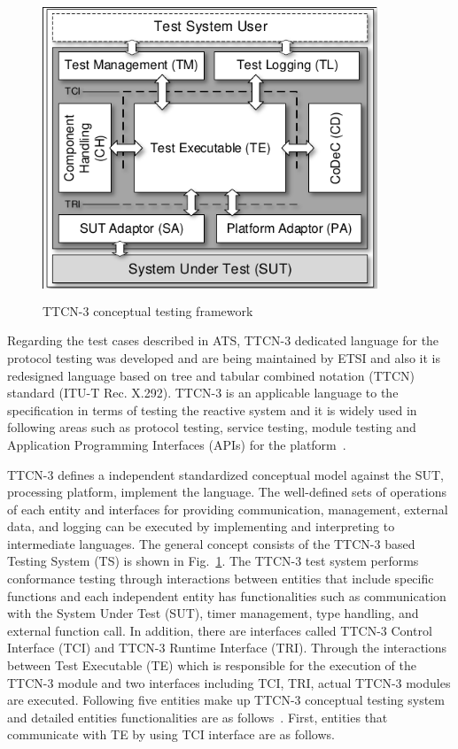 \begin{figure}[H]			%
	\centering
	\includegraphics[width=10cm,height=9cm]{figures/fig_TTCN3_conceptual_testing_framework.pdf}
    \caption{TTCN-3 conceptual testing framework}
    \label{fig:ttcn-3_conceptual_testing_framework}
\end{figure}

Regarding the test cases described in ATS, TTCN-3 dedicated language for the protocol testing was developed and are being maintained by ETSI and also it is redesigned language based on tree and tabular combined notation (TTCN) standard (ITU-T Rec. X.292). TTCN-3 is an applicable language to the specification in terms of testing the reactive system and it is widely used in following areas such as protocol testing, service testing, module testing and Application Programming Interfaces (APIs) for the platform~\cite{grabowski2003introduction}.

TTCN-3 defines a independent standardized conceptual model against the SUT, processing platform, implement the language. The well-defined sets of operations of each entity and interfaces for providing communication, management, external data, and logging can be executed by implementing and interpreting to intermediate languages.
The general concept consists of the TTCN-3 based Testing System (TS) is shown in Fig.~\ref{fig:ttcn-3_conceptual_testing_framework}. The TTCN-3 test system performs conformance testing through interactions between entities that include specific functions and each independent entity has functionalities such as communication with the System Under Test (SUT), timer management, type handling, and external function call. In addition, there are interfaces called TTCN-3 Control Interface (TCI) and TTCN-3 Runtime Interface (TRI). Through the interactions between Test Executable (TE) which is responsible for the execution of the TTCN-3 module and two interfaces including TCI, TRI, actual TTCN-3 modules are executed. Following five entities make up TTCN-3 conceptual testing system and detailed entities functionalities are as follows~\cite{willcock2005introduction}. First, entities that communicate with TE by using TCI interface are as follows.


